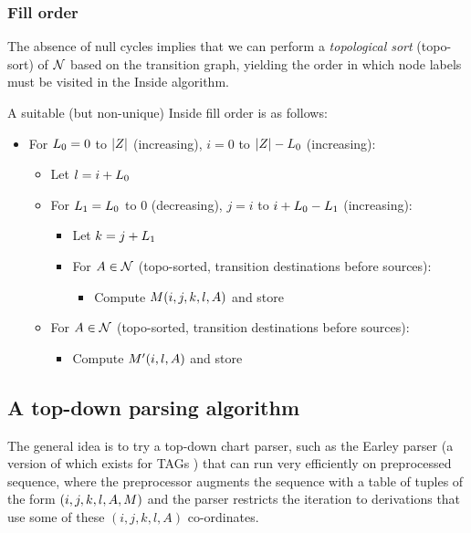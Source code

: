 \documentclass[10pt]{article}
\newcommand{\seclabel}[1]{\label{sec:#1}}
\begin{document}
\subsubsection{Fill order}

The absence of null cycles implies that we can perform a {\em topological sort} (topo-sort) of ${\cal N}$ based on the transition graph,
yielding the order in which node labels must be visited in the Inside algorithm.

A suitable (but non-unique) Inside fill order is as follows:
\begin{itemize}
 \item For $L_0 = 0$ to $|Z|$ (increasing), \quad $i = 0$ to $|Z|-L_0$ (increasing):
 \begin{itemize}
  \item Let $l = i + L_0$
  \item For $L_1 = L_0$ to $0$ (decreasing), \quad $j = i$ to $i + L_0 - L_1$ (increasing):
  \begin{itemize}
   \item Let $k = j + L_1$
   \item For $A \in {\cal N}$ (topo-sorted, transition destinations before sources):
   \begin{itemize}
    \item Compute $M(i,j,k,l,A)$ and store
   \end{itemize}
  \end{itemize}
  \item For $A \in {\cal N}$ (topo-sorted, transition destinations before sources):
  \begin{itemize}
   \item Compute $M'(i,l,A)$ and store
  \end{itemize}
 \end{itemize}
\end{itemize}


\subsection{A top-down parsing algorithm}
\seclabel{TopDownParser}

The general idea is to try a top-down chart parser, such as the Earley parser \cite{Earley70}
(a version of which exists for TAGs \cite{kallmeyer2010parsing})
that can run very efficiently on preprocessed sequence,
where the preprocessor augments the sequence with a table of tuples of the form $(i,j,k,l,A,M)$
and the parser restricts the iteration to derivations that use some of these $(i,j,k,l,A)$ co-ordinates.
\end{document}
